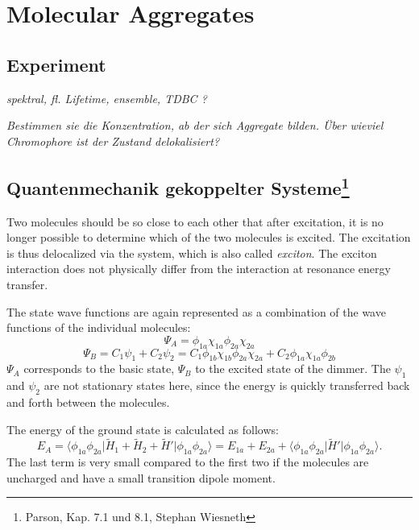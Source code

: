 

\chapter{Molecular Aggregates}

\section{Experiment}

\textit{spektral, fl. Lifetime, ensemble, TDBC ?
}

\textit{Bestimmen sie die Konzentration, ab der sich Aggregate bilden. Über wieviel Chromophore ist der Zustand delokalisiert?}


\section{Quantenmechanik gekoppelter Systeme\protect\footnote{Parson, Kap. 7.1 und 8.1, Stephan Wiesneth}} 



Two molecules should be so close to each other that after excitation, it is no longer possible to determine which of the two molecules is excited. The excitation is thus delocalized via the system, which is also called \textit{exciton}. The exciton interaction does not physically differ from the interaction at resonance energy transfer.

The state wave functions are again represented as a combination of the wave functions of the individual molecules:
\[ \Psi_A = \phi_{1a}\chi_{1a}\phi_{2a}\chi_{2a} \]
\[ \Psi_B = C_1\psi_1 + C_2\psi_2 = C_1\phi_{1b}\chi_{1b}\phi_{2a}\chi_{2a} + C_2\phi_{1a}\chi_{1a}\phi_{2b} \] 
$\Psi_A$ corresponds to the basic state, $\Psi_B$ to the excited state of the dimmer. The $\psi_1$ and $\psi_2$ are not stationary states here, since the energy is quickly transferred back and forth between the molecules.

The energy of the ground state is calculated as follows:
\begin{equation}
    E_A = \langle\phi_{1a}\phi_{2a}\lvert\tilde{H}_1+\tilde{H}_2+\tilde{H}'\rvert\phi_{1a}\phi_{2a}\rangle = E_{1a}+E_{2a}+\langle\phi_{1a}\phi_{2a}\lvert\tilde{H}'\rvert\phi_{1a}\phi_{2a}\rangle.
\end{equation}
The last term is very small compared to the first two if the molecules are uncharged and have a small transition dipole moment.

